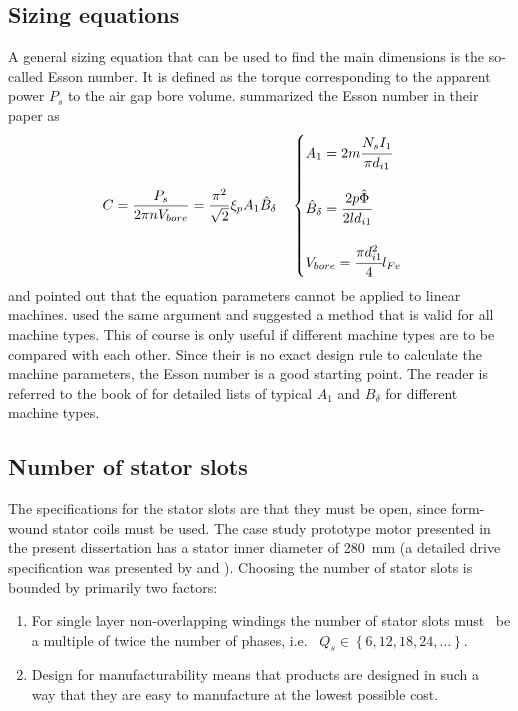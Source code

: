\subsection{Sizing equations}
A general sizing equation that can be used to find the main dimensions is the so-called Esson number. It is defined as the torque corresponding to the apparent power $P_s$ to the air gap bore volume. \cite{Gutt1998} summarized the Esson number in their paper as
\begin{equation}
  \label{eqn:Esson}
  C = \frac{P_s}{2\pi n V_{bore}}=\frac{\pi^2}{\sqrt{2}}\xi_p A_1 \hat{B}_{\delta}
  \quad
  \begin{cases}
    A_1 = 2m\cfrac{N_s I_1}{\pi d_{i1}} \\
    \: \\
    \hat{B}_{\delta} = \cfrac{2p\hat{\Phi}}{2ld_{i1}}\\
    \: \\
    V_{bore}=\cfrac{\pi d_{i1}^{2}}{4}l_{Fe}
  \end{cases}  
\end{equation} 
and pointed out that the equation parameters cannot be applied to linear machines. \cite{Ronghai2004} used the same argument and suggested a method that is valid for all machine types. This of course is only useful if different machine types are to be compared with each other. Since their is no exact design rule to calculate the machine parameters, the Esson number is a good starting point. The reader is referred to the book of \cite{Vogt1996} for detailed lists of typical $A_1$ and $B_{\delta}$ for different machine types. 

\subsection{Number of stator slots}\label{subsec:number_of_slots}
The specifications for the stator slots are that they must be open, since form-wound stator coils must be used. The case study prototype motor presented in the present dissertation has a stator inner diameter of \SI{280}{mm} (a detailed drive specification was presented by \cite{germishuizen_2006} and \cite{joeckel_2006}). Choosing the number of stator slots is bounded by primarily two factors:
\begin{enumerate}
	\item For single layer non-overlapping windings the number of stator slots must~%
	be a multiple of twice the number of phases, i.e.~%
	$Q_{s} \in \left\{6,12,18,24,\ldots\right\}$.
	\item Design for manufacturability means that products are designed in such a~%
	way that they are easy to manufacture at the lowest possible cost.
\end{enumerate}

